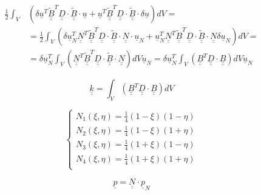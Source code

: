 \documentclass[a4paper]{jpconf}
\begin{document}
\begin{equation}
\begin{split}
\frac{1}{2}\int_{V}&\left(\delta\underline{u}^{T}\underline{\underline{\widetilde{B}}}^{T}\underline{\underline{D}}\cdot\underline{\underline{\widetilde{B}}}\cdot\underline{u}+\underline{u}^{T}\underline{\underline{\widetilde{B}}}^{T}\underline{\underline{D}}\cdot\underline{\underline{\widetilde{B}}}\cdot\delta\underline{u}\right)dV=\\&
=\frac{1}{2}\int_{V}\left(\delta\underline{u}^{T}_{N}\underline{\underline{N}}^{T}\underline{\underline{\widetilde{B}}}^{T}\underline{\underline{D}}\cdot\underline{\underline{\widetilde{B}}}\cdot\underline{\underline{N}}\cdot\underline{u}_{N}+\underline{u}^{T}_{N}\underline{\underline{N}}^{T}\underline{\underline{\widetilde{B}}}^{T}\underline{\underline{D}}\cdot\underline{\underline{\widetilde{B}}}\cdot\underline{\underline{N}}\delta\underline{u}_{N}\right)dV=\\&
=\delta\underline{u}^{T}_{N}\int_{V}\left(\underline{\underline{N}}^{T}\underline{\underline{\widetilde{B}}}^{T}\underline{\underline{D}}\cdot\underline{\underline{\widetilde{B}}}\cdot\underline{\underline{N}}\right)dV\underline{u}_{N}=\delta\underline{u}^{T}_{N}\int_{V}\left(\underline{\underline{B}}^{T}\underline{\underline{D}}\cdot\underline{\underline{B}}\right)dV\underline{u}_{N}
\end{split}
\end{equation}

\begin{equation}
\underline{\underline{k}}=\int_{V}\left(\underline{\underline{B}}^{T}\underline{\underline{D}}\cdot\underline{\underline{B}}\right)dV
\end{equation}

\begin{equation}
\begin{cases}
N_{1}\left(\xi,\eta\right)=\frac{1}{4}\left(1-\xi\right)\left(1-\eta\right)\\
N_{2}\left(\xi,\eta\right)=\frac{1}{4}\left(1-\xi\right)\left(1+\eta\right)\\
N_{3}\left(\xi,\eta\right)=\frac{1}{4}\left(1+\xi\right)\left(1-\eta\right)\\
N_{4}\left(\xi,\eta\right)=\frac{1}{4}\left(1+\xi\right)\left(1+\eta\right)\\
\end{cases}
\end{equation}

\begin{equation}
\underline{p}=\underline{\underline{N}}\cdot\underline{p}_{N}
\end{equation}
\end{document}
